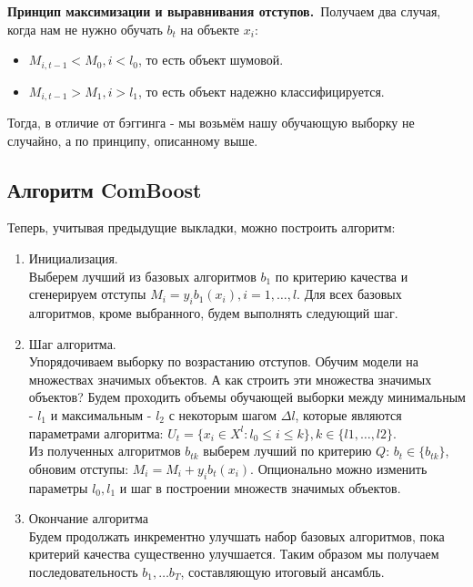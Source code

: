 \textbf{Принцип максимизации и выравнивания отступов.}\
Получаем два случая, когда нам не нужно обучать $b_t$ на объекте $x_i$: \\
\begin{itemize}
    \item $M_{i,t-1} < M_0, i<l_0$, то есть объект шумовой.
    \item $M_{i,t-1} > M_1, i>l_1$, то есть объект надежно классифицируется.
\end{itemize}

Тогда, в отличие от бэггинга - мы возьмём нашу обучающую выборку не случайно, а по принципу, описанному выше. \\

\subsection{Алгоритм ComBoost}

Теперь, учитывая предыдущие выкладки, можно построить алгоритм:
\begin{enumerate}
    \item Инициализация. \\
          Выберем лучший из базовых алгоритмов $b_1$ по критерию качества и сгенерируем отступы $M_i = y_ib_1(x_i), i=1,\dots,l$. Для всех базовых алгоритмов, кроме выбранного, будем выполнять следующий шаг.
    \item Шаг алгоритма. \\
          Упорядочиваем выборку по возрастанию отступов. Обучим модели на множествах значимых объектов. А как строить эти множества значимых объектов? Будем проходить объемы обучающей выборки между минимальным - $l_1$ и максимальным - $l_2$ с некоторым шагом $\Delta l$, которые являются параметрами алгоритма: $U_t = \{x_i \in X^l : l_0 \leq i \leq k\}, k \in \{l1, \dots, l2\}$. \\
          Из полученных алгоритмов $b_{tk}$ выберем лучший по критерию $Q$: $b_t \in \{b_{tk}\}$, обновим отступы: $M_i = M_i + y_i b_t(x_i)$. Опционально можно изменить параметры $l_0, l_1$ и шаг в построении множеств значимых объектов.
    \item Окончание алгоритма \\
          Будем продолжать инкрементно улучшать набор базовых алгоритмов, пока критерий качества существенно улучшается.
          Таким образом мы получаем последовательность $b_1, \dots b_T$, составляющую итоговый ансамбль.
\end{enumerate}


